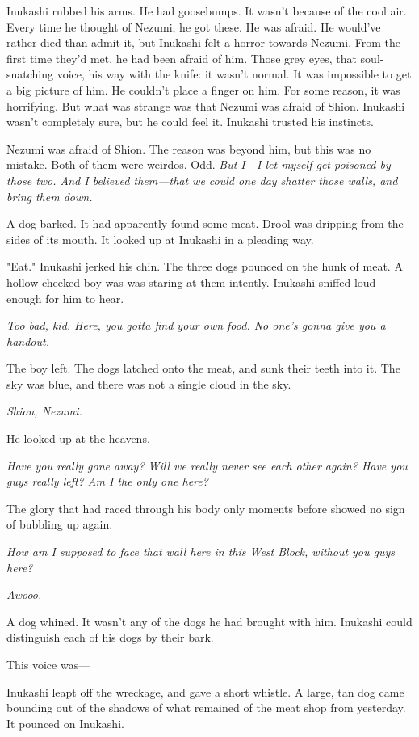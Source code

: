 Inukashi rubbed his arms. He had goosebumps. It wasn't because of the
cool air. Every time he thought of Nezumi, he got these. He was afraid.
He would've rather died than admit it, but Inukashi felt a horror
towards Nezumi. From the first time they'd met, he had been afraid of
him. Those grey eyes, that soul-snatching voice, his way with the knife:
it wasn't normal. It was impossible to get a big picture of him. He
couldn't place a finger on him. For some reason, it was horrifying. But
what was strange was that Nezumi was afraid of Shion. Inukashi wasn't
completely sure, but he could feel it. Inukashi trusted his instincts.

Nezumi was afraid of Shion. The reason was beyond him, but this was no
mistake. Both of them were weirdos. Odd. \emph{But I---I let myself get poisoned
by those two. And I believed them---that we could one day shatter those
walls, and bring them down.}

A dog barked. It had apparently found some meat. Drool was dripping from
the sides of its mouth. It looked up at Inukashi in a pleading way.

"Eat." Inukashi jerked his chin. The three dogs pounced on the hunk of
meat. A hollow-cheeked boy was was staring at them intently. Inukashi
sniffed loud enough for him to hear.

\emph{Too bad, kid. Here, you gotta find your own food. No one's gonna give
you a handout.}

The boy left. The dogs latched onto the meat, and sunk their teeth into
it. The sky was blue, and there was not a single cloud in the sky.

\emph{Shion, Nezumi.}

He looked up at the heavens.

\emph{Have you really gone away? Will we really never see each other again?
Have you guys really left? Am I the only one here?}

The glory that had raced through his body only moments before showed no
sign of bubbling up again.

\emph{How am I supposed to face that wall here in this West Block, without you
guys here?}

\emph{Awooo.}

A dog whined. It wasn't any of the dogs he had brought with him.
Inukashi could distinguish each of his dogs by their bark.

This voice was---

Inukashi leapt off the wreckage, and gave a short whistle. A large, tan
dog came bounding out of the shadows of what remained of the meat shop
from yesterday. It pounced on Inukashi.

